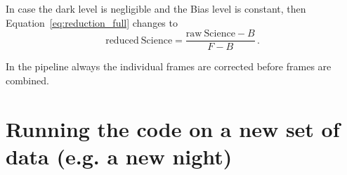\documentclass[10pt,a4paper]{article}
\begin{document}
In case the dark level is negligible and the Bias level is constant, then Equation~\ref{eq:reduction_full} changes to
\begin{equation}
  \mathrm{reduced\ Science} = \frac{\mathrm{raw\ Science} - B}{F - B}\,.
\end{equation}


In the pipeline always the individual frames are corrected before frames are combined.


\newpage
\section{Running the code on a new set of data (e.g. a new night)}
\label{Section:running_the_code}
\end{document}
